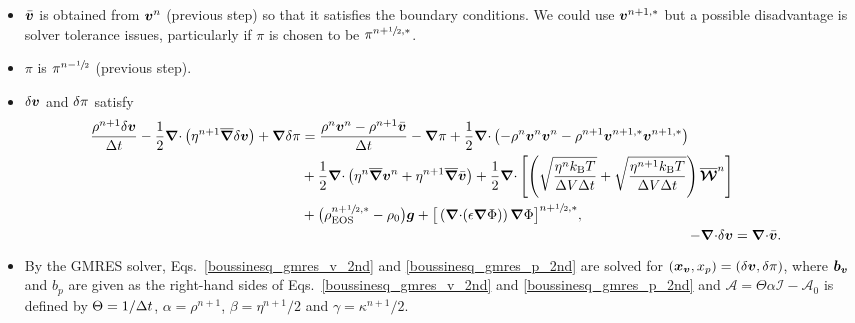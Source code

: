 \documentclass[
10pt
showpacs, showkeys,
amsmath,amssymb,
aps,
pre,
floatfix,
]{revtex4-1}
\newcommand{\divg}{{\V\nabla\cdot}}                       %
\begin{document}
\begin{enumerate}
\begin{itemize}
\item $\bar{\boldsymbol{v}}$ is obtained from $\boldsymbol{v}^n$ (previous step) so that it satisfies the boundary conditions.  We could use $\boldsymbol{v}^{n+1,*}$
but a possible disadvantage is solver tolerance issues, particularly if $\pi$ is chosen to be $\pi^{n+\sfrac{1}{2},*}$.
\item $\pi$ is $\pi^{n-\sfrac{1}{2}}$ (previous step).
\item $\delta\boldsymbol{v}$ and $\delta\pi$ satisfy
\begin{align}
\label{boussinesq_gmres_v_2nd}
\begin{split}
\frac{\rho^{n+1}\d{\V{v}}}{\D{t}} - \frac{1}{2}\divg\left(\eta^{n+1}\overline{\grad}\d{\V{v}}\right) + \grad\d{\pi}
& = \frac{\rho^n\V{v}^n-\rho^{n+1}\bar{\V{v}}}{\D{t}} - \grad\pi 
+ \frac{1}{2}\divg\left(-\rho^n\V{v}^n\V{v}^n-\rho^{n+1}\V{v}^{n+1,*}\V{v}^{n+1,*}\right) \\
& + \frac{1}{2}\divg\left( \eta^n\overline{\grad}\V{v}^n + \eta^{n+1}\overline{\grad}\bar{\V{v}} \right) 
+ \frac{1}{2}\divg\left[\left( \sqrt{\frac{\eta^n k_\mathrm{B}T}{\D{V}\D{t}}} + \sqrt{\frac{\eta^{n+1} k_\mathrm{B}T}{\D{V}\D{t}}} \right) \overline{\V{\mathcal{W}}}^n \right] \\
& + \big(\rho^{n+\myhalf,*}_\mathrm{EOS}-\rho_0\big)\V{g} + \big[\left(\divg(\epsilon\grad\Phi)\right)\grad\Phi\big]^{n+\myhalf,*},
\end{split} \\
\label{boussinesq_gmres_p_2nd}
-\divg\d{\V{v}} &= \divg\bar{\V{v}}.
\end{align}
\item By the GMRES solver, Eqs.~\eqref{boussinesq_gmres_v_2nd} and \eqref{boussinesq_gmres_p_2nd} are solved for $(\boldsymbol{x}_{\boldsymbol{v}},x_p)=(\delta\boldsymbol{v},\delta\pi)$, where $\boldsymbol{b}_{\boldsymbol{v}}$ and $b_p$ are given as the right-hand sides of Eqs.~\eqref{boussinesq_gmres_v_2nd} and \eqref{boussinesq_gmres_p_2nd} and $\mathcal{A}=\Theta\alpha\mathcal{I}-\mathcal{A}_0$ is defined by $\Theta=1/\Delta t$, $\alpha=\rho^{n+1}$, $\beta=\eta^{n+1}/2$ and $\gamma=\kappa^{n+1}/2$.
\end{itemize}

\end{enumerate}
\end{document}
